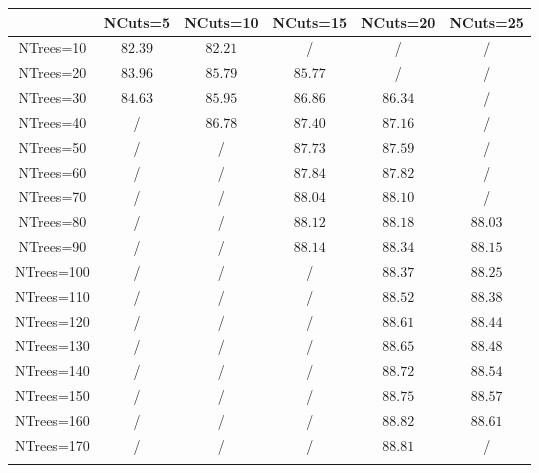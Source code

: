 \centering
\begin{tabular}{cccccc} \toprule\toprule
 & NCuts=5 & NCuts=10 & NCuts=15 & NCuts=20 & NCuts=25\\\midrule
NTrees=10 & $82.39$ & $82.21$ &  / &  / &  /\\
NTrees=20 & $83.96$ & $85.79$ & $85.77$ &  / &  /\\
NTrees=30 & $84.63$ & $85.95$ & $86.86$ & $86.34$ &  /\\
NTrees=40 &  / & $86.78$ & $87.40$ & $87.16$ &  /\\
NTrees=50 &  / &  / & $87.73$ & $87.59$ &  /\\
NTrees=60 &  / &  / & $87.84$ & $87.82$ &  /\\
NTrees=70 &  / &  / & $88.04$ & $88.10$ &  /\\
NTrees=80 &  / &  / & $88.12$ & $88.18$ & $88.03$\\
NTrees=90 &  / &  / & $88.14$ & $88.34$ & $88.15$\\
NTrees=100 &  / &  / &  / & $88.37$ & $88.25$\\
NTrees=110 &  / &  / &  / & $88.52$ & $88.38$\\
NTrees=120 &  / &  / &  / & $88.61$ & $88.44$\\
NTrees=130 &  / &  / &  / & $88.65$ & $88.48$\\
NTrees=140 &  / &  / &  / & $88.72$ & $88.54$\\
NTrees=150 &  / &  / &  / & $88.75$ & $88.57$\\
NTrees=160 &  / &  / &  / & $88.82$ & $88.61$\\
NTrees=170 &  / &  / &  / & $88.81$ &  /\\
\bottomrule\bottomrule\\
\end{tabular}
